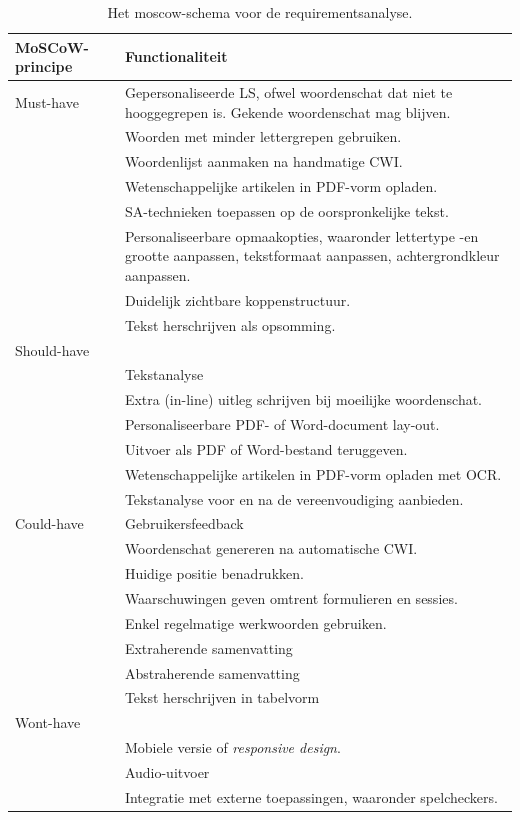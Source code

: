 \begin{center}
	\begin{table}[H]
		\begin{tabular}{ | m{2cm} | m{11cm} | } 
			\hline
			\textbf{MoSCoW-principe} & \textbf{Functionaliteit} \\
			\hline
			Must-have & Gepersonaliseerde LS, ofwel woordenschat dat niet te hooggegrepen is. Gekende woordenschat mag blijven. \\
			& Woorden met minder lettergrepen gebruiken. \\
			& Woordenlijst aanmaken na handmatige CWI. \\
			& Wetenschappelijke artikelen in PDF-vorm opladen. \\
			& SA-technieken toepassen op de oorspronkelijke tekst. \\
			& Personaliseerbare opmaakopties, waaronder lettertype -en grootte aanpassen, tekstformaat aanpassen, achtergrondkleur aanpassen. \\
			& Duidelijk zichtbare koppenstructuur. \\
			& Tekst herschrijven als opsomming. \\
			\hline
			Should-have & \\
			& Tekstanalyse \\
			& Extra (in-line) uitleg schrijven bij moeilijke woordenschat. \\
			& Personaliseerbare PDF- of Word-document lay-out. \\
			& Uitvoer als PDF of Word-bestand teruggeven. \\
			& Wetenschappelijke artikelen in PDF-vorm opladen met OCR. \\
			& Tekstanalyse voor en na de vereenvoudiging aanbieden. \\
			\hline
			Could-have 
			& Gebruikersfeedback \\
			& Woordenschat genereren na automatische CWI. \\
			& Huidige positie benadrukken. \\
			& Waarschuwingen geven omtrent formulieren en sessies. \\
			& Enkel regelmatige werkwoorden gebruiken. \\
			& Extraherende samenvatting \\
			& Abstraherende samenvatting \\
			& Tekst herschrijven in tabelvorm \\
			\hline
			Wont-have & \\
			& Mobiele versie of \textit{responsive design}. \\
			& Audio-uitvoer \\
			& Integratie met externe toepassingen, waaronder spelcheckers. \\
			\hline
		\end{tabular}
		\caption{Het moscow-schema voor de requirementsanalyse.}
		\label{img:moscow-table}
	\end{table}
\end{center}

